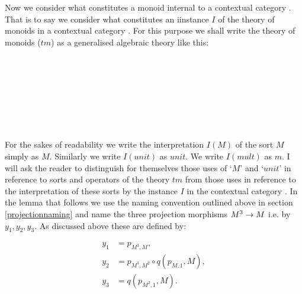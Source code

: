 
Now we consider what constitutes a monoid internal to a contextual category \catc. That is to say 
we consider what constitutes an iinstance $I$ of the theory of monoids   in a contextual category \catc.
For this purpose we shall write the theory of monoids ($tm$) as a generalised algebraic theory like this: 
\begin{gatrules}
\gatintros
{}
 \\
 \\
 \\
\gataxioms

\begin{gatgroup}{}
 \\
\end{gatgroup} \\
\end{gatrules}

For the sakes of readability we write the interpretation $I(M)$ of the sort $M$ simply as $M$. Similarly we write $I(unit)$ as $unit$. We write $I(mult)$ as $m$. I will ask the reader  to distinguish for themselves 
those uses of `$M$' and `$unit$' in reference to sorts and operators of the theory $tm$ from those uses in reference to the interpretation of these sorts by the instance $I$ in the contextual category \catc. 
  In the  lemma that follows we use the naming convention outlined above in section \ref{projectionnaming} and name the three projection morphisms $M^3 \rightarrow M$ i.e. by $y_1, y_2, y_3$.
As discussed above these are defined by:

\begin{align*}
y_1 &= p_{M^3,M}, \\
y_2 &= p_{M^3,M^2} \circ q(p_{M,1},M), \\
y_3 &= q(p_{M^2,1},M). \hspace{1cm}\\
\end{align*}

\newcommand{\wM}{\ofT{w}{M}}
\newcommand{\xM}{\ofT{x_1, x_2}{M}}
\newcommand{\yM}{\ofT{y_1, y_2, y_3}{M}}
\newcommand{\doubleM}{M^2}                       %
\newcommand{\trebleM}{M^3}                       %
\newcommand{\quadM}{M^4}                         %
\newcommand{\spi}{s(p_{M^3,M^i})}
\newcommand{\sptrebleone}{s(p_{M^3,M^1})}
\newcommand{\sptrebletwo}{s(p_{M^3,M^2})}
\newcommand{\sptreblethree}{s(p_{M^3,M^3})}
\newcommand{\fmult}{m}  %

